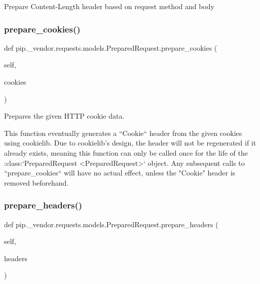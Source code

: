 \begin{DoxyVerb}Prepare Content-Length header based on request method and body\end{DoxyVerb}
 \mbox{\label{classpip_1_1__vendor_1_1requests_1_1models_1_1PreparedRequest_a8a4ec0b3fa88d623586de453cd502836}} 
\subsubsection{\texorpdfstring{prepare\+\_\+cookies()}{prepare\_cookies()}}
{\footnotesize\ttfamily def pip.\+\_\+vendor.\+requests.\+models.\+Prepared\+Request.\+prepare\+\_\+cookies (\begin{DoxyParamCaption}\item[{}]{self,  }\item[{}]{cookies }\end{DoxyParamCaption})}

\begin{DoxyVerb}Prepares the given HTTP cookie data.

This function eventually generates a ``Cookie`` header from the
given cookies using cookielib. Due to cookielib's design, the header
will not be regenerated if it already exists, meaning this function
can only be called once for the life of the
:class:`PreparedRequest <PreparedRequest>` object. Any subsequent calls
to ``prepare_cookies`` will have no actual effect, unless the "Cookie"
header is removed beforehand.
\end{DoxyVerb}
 \mbox{\label{classpip_1_1__vendor_1_1requests_1_1models_1_1PreparedRequest_a6165dd3dd57ddffd65cf614e00dd9abd}} 
\subsubsection{\texorpdfstring{prepare\+\_\+headers()}{prepare\_headers()}}
{\footnotesize\ttfamily def pip.\+\_\+vendor.\+requests.\+models.\+Prepared\+Request.\+prepare\+\_\+headers (\begin{DoxyParamCaption}\item[{}]{self,  }\item[{}]{headers }\end{DoxyParamCaption})}

